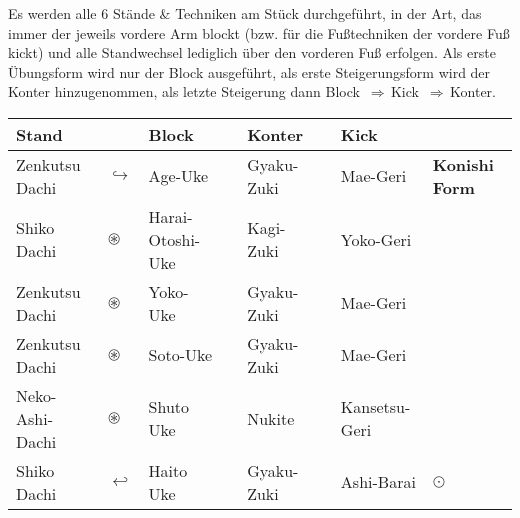 	\null\vfill\null
	\begin{center}
		\parbox{\textwidth-2\tabcolsep}{Es werden alle 6 Stände \& Techniken am Stück durchgeführt, in der Art, das immer der jeweils vordere Arm blockt (bzw. für die Fußtechniken der vordere Fuß kickt) und alle Standwechsel lediglich über den vorderen Fuß erfolgen. Als erste Übungsform wird nur der Block ausgeführt, als erste Steigerungsform wird der Konter hinzugenommen, als letzte Steigerung dann \mbox{Block \(\Rightarrow\)\,Kick \(\Rightarrow\)\,Konter.}}
	\end{center}
	\begin{tabularx}{\textwidth}{lllXlXll}
		Stand	&&Block	&&Konter	&&Kick&\\
		\midrule
		Zenkutsu Dachi 	& \(\hookrightarrow\) & Age-Uke	&&Gyaku-Zuki	&&Mae-Geri&\textbf{Konishi Form}\\
		Shiko Dachi 	& \(\circledast\) & Harai-Otoshi-Uke	&&Kagi-Zuki&&Yoko-Geri&\\
		Zenkutsu Dachi	& \(\circledast\) & Yoko-Uke	&&Gyaku-Zuki&&Mae-Geri&\\
		Zenkutsu Dachi	& \(\circledast\) & Soto-Uke	&&Gyaku-Zuki&&Mae-Geri&\\
		Neko-Ashi-Dachi	& \(\circledast\) & Shuto Uke	&&Nukite&&Kansetsu-Geri&\\
		Shiko Dachi	& \(\hookleftarrow\) & Haito Uke	&&Gyaku-Zuki&&Ashi-Barai& \(\odot\)\\
		\midrule
	\end{tabularx}\\\null\vfill\null